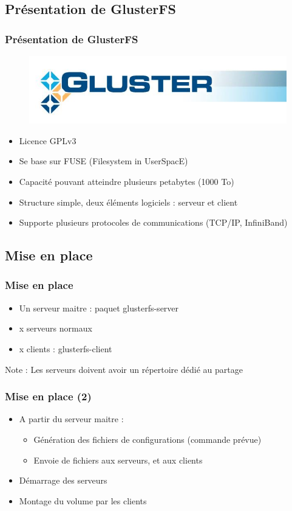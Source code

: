 \documentclass[blue]{beamer}
\begin{document}
	\subsection{Présentation de GlusterFS}
	\begin{frame}
		\frametitle{Présentation de GlusterFS}
		\begin{figure}
			\includegraphics[width=0.4\linewidth]{../images/glusterfs.png}
		\end{figure}

		\begin{itemize}
			\item Licence GPLv3
			\item Se base sur FUSE (Filesystem in UserSpacE)
			\item Capacité pouvant atteindre plusieurs petabytes (1000 To)
			\item Structure simple, deux éléments logiciels : serveur et client
			\item Supporte plusieurs protocoles de communications (TCP/IP, InfiniBand)
		\end{itemize}
	\end{frame}
	
	\subsection{Mise en place}
	\begin{frame}
		\frametitle{Mise en place}
		\begin{itemize}
			\item Un serveur maitre : paquet glusterfs-server
			\item x serveurs \og normaux\fg
			\item x clients : glusterfs-client
		\end{itemize}

		\begin{block}{Note :}
			Les serveurs doivent avoir un répertoire dédié au partage
		\end{block}
	\end{frame}

	\begin{frame}
		\frametitle{Mise en place (2)}
			\begin{itemize}
				\item A partir du serveur maitre :
				\begin{itemize}
					\item Génération des fichiers de configurations (commande prévue)
					\item Envoie de fichiers aux serveurs, et aux clients
				\end{itemize}
				\item Démarrage des serveurs
				\item Montage du volume par les clients
			\end{itemize}
	\end{frame}
\end{document}
